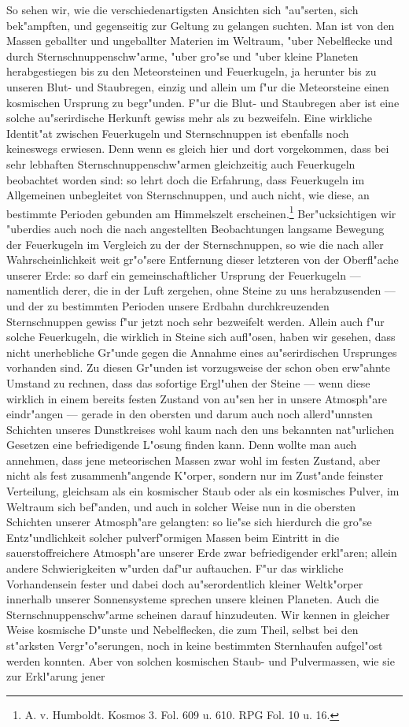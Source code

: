 \documentclass[a4paper, 8pt, oneside, polutonikogreek, german]{article}
\begin{document}
So sehen wir, wie die verschiedenartigsten Ansichten sich "au"serten, sich bek"ampften, und gegenseitig zur Geltung zu gelangen suchten. Man ist von den Massen geballter und ungeballter Materien im Weltraum, "uber Nebelflecke und durch Sternschnuppenschw"arme, "uber gro"se und "uber kleine Planeten herabgestiegen bis zu den Meteorsteinen und Feuerkugeln, ja herunter bis zu unseren Blut- und Staubregen, einzig und allein um f"ur die Meteorsteine einen kosmischen Ursprung zu begr"unden. F"ur die Blut- und Staubregen aber ist eine solche au"serirdische Herkunft gewiss mehr als zu bezweifeln. Eine wirkliche Identit"at zwischen Feuerkugeln und Sternschnuppen ist ebenfalls noch keineswegs erwiesen. Denn wenn es gleich hier und dort vorgekommen, dass bei sehr lebhaften Sternschnuppenschw"armen gleichzeitig auch Feuerkugeln beobachtet worden sind: so lehrt doch die Erfahrung, dass Feuerkugeln im Allgemeinen unbegleitet von Sternschnuppen, und auch nicht, wie diese, an bestimmte Perioden gebunden am Himmelszelt erscheinen.\footnote{A. v. Humboldt. Kosmos 3. Fol. 609 u. 610. RPG Fol. 10 u. 16.} Ber"ucksichtigen wir "uberdies auch noch die nach angestellten Beobachtungen langsame Bewegung der Feuerkugeln im Vergleich zu der der Sternschnuppen, so wie die nach aller Wahrscheinlichkeit weit gr"o"sere Entfernung dieser letzteren von der Oberfl"ache unserer Erde: so darf ein gemeinschaftlicher Ursprung der Feuerkugeln --- namentlich derer, die in der Luft zergehen, ohne Steine zu uns herabzusenden --- und der zu bestimmten Perioden unsere Erdbahn durchkreuzenden Sternschnuppen gewiss f"ur jetzt noch sehr bezweifelt werden. Allein auch f"ur solche Feuerkugeln, die wirklich in Steine sich aufl"osen, haben wir gesehen, dass nicht unerhebliche Gr"unde gegen die Annahme eines au"serirdischen Ursprunges vorhanden sind. Zu diesen Gr"unden ist vorzugsweise der schon oben erw"ahnte Umstand zu rechnen, dass das sofortige Ergl"uhen der Steine --- wenn diese wirklich in einem bereits festen Zustand von au"sen her in unsere Atmosph"are eindr"angen --- gerade in den obersten und darum auch noch allerd"unnsten Schichten unseres Dunstkreises wohl kaum nach den uns bekannten nat"urlichen Gesetzen eine befriedigende L"osung finden kann. Denn wollte man auch annehmen, dass jene meteorischen Massen zwar wohl im festen Zustand, aber nicht als fest zusammenh"angende K"orper, sondern nur im Zust"ande feinster Verteilung, gleichsam als ein kosmischer Staub oder als ein kosmisches Pulver, im Weltraum sich bef"anden, und auch in solcher Weise nun in die obersten Schichten unserer Atmosph"are gelangten: so lie"se sich hierdurch die gro"se Entz"undlichkeit solcher pulverf"ormigen Massen beim Eintritt in die sauerstoffreichere Atmosph"are unserer Erde zwar befriedigender erkl"aren; allein andere Schwierigkeiten w"urden daf"ur auftauchen. F"ur das wirkliche Vorhandensein fester und dabei doch au"serordentlich kleiner Weltk"orper innerhalb unserer Sonnensysteme sprechen unsere kleinen Planeten. Auch die Sternschnuppenschw"arme scheinen darauf hinzudeuten. Wir kennen in gleicher Weise kosmische D"unste und Nebelflecken, die zum Theil, selbst bei den st"arksten Vergr"o"serungen, noch in keine bestimmten Sternhaufen aufgel"ost werden konnten. Aber von solchen kosmischen Staub- und Pulvermassen, wie sie zur Erkl"arung jener 
\end{document}
